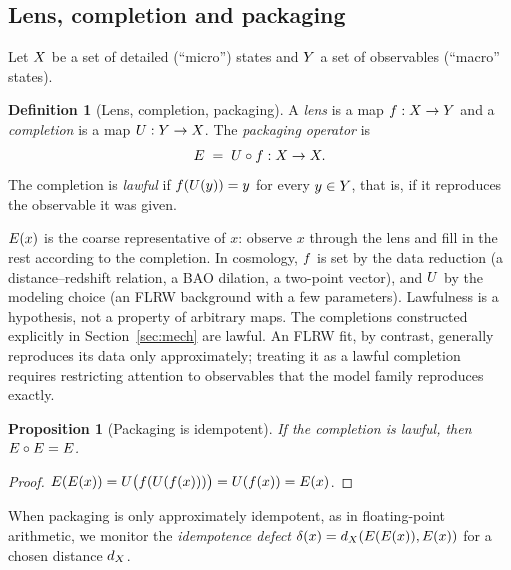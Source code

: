 \documentclass[11pt]{article}
\theoremstyle{plain}
\newtheorem{proposition}[theorem]{Proposition}
\theoremstyle{definition}
\newtheorem{definition}[theorem]{Definition}
\theoremstyle{remark}
\begin{document}
\subsection{Lens, completion and packaging}\label{sec:framework:packaging}

Let $X$ be a set of detailed (``micro'') states and $Y$ a set of observables (``macro'' states).

\begin{definition}[Lens, completion, packaging]\label{def:packaging}
A \emph{lens} is a map $f:X\to Y$ and a \emph{completion} is a map $U:Y\to X$. The \emph{packaging operator} is
\begin{equation}
E \;=\; U\circ f:X\to X .
\label{eq:packaging_def}
\end{equation}
The completion is \emph{lawful} if $f(U(y))=y$ for every $y\in Y$, that is, if it reproduces the observable it was given.
\end{definition}

$E(x)$ is the coarse representative of $x$: observe $x$ through the lens and fill in the rest according to the completion. In cosmology, $f$ is set by the data reduction (a distance--redshift relation, a BAO dilation, a two-point vector), and $U$ by the modeling choice (an FLRW background with a few parameters). Lawfulness is a hypothesis, not a property of arbitrary maps. The completions constructed explicitly in Section~\ref{sec:mech} are lawful. An FLRW fit, by contrast, generally reproduces its data only approximately; treating it as a lawful completion requires restricting attention to observables that the model family reproduces exactly.

\begin{proposition}[Packaging is idempotent]\label{prop:idempotent}
If the completion is lawful, then $E\circ E=E$.
\end{proposition}
\begin{proof}
$E(E(x))=U\big(f(U(f(x)))\big)=U(f(x))=E(x)$.
\end{proof}

When packaging is only approximately idempotent, as in floating-point arithmetic, we monitor the \emph{idempotence defect} $\delta(x)=d_{X}(E(E(x)),E(x))$ for a chosen distance $d_{X}$.
\end{document}
